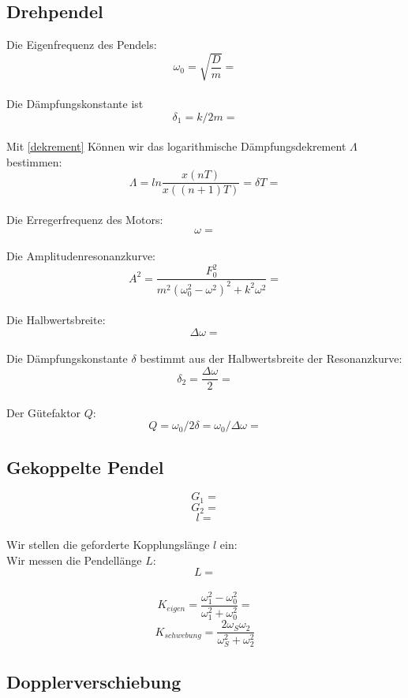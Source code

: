 \documentclass{article}
\begin{document}
\subsection{Drehpendel}
Die Eigenfrequenz des Pendels:
$$\omega_0=\sqrt{\frac{D}{m}}=$$
\\
Die Dämpfungskonstante ist
$$\delta_1=k/2m=$$
\\
Mit \ref{dekrement} Können wir das logarithmische Dämpfungsdekrement $\Lambda$ bestimmen:
$$\Lambda=ln\frac{x(nT)}{x((n+1)T)}=\delta T=$$
\\
Die Erregerfrequenz des Motors:
$$\omega=$$
\\
Die Amplitudenresonanzkurve:
$$A^2=\frac{F_0^2}{m^2(\omega_0^2-\omega^2)^2+k^2\omega^2}=$$
\\
Die Halbwertsbreite:
$$\Delta \omega=$$
\\
Die Dämpfungskonstante $\delta$ bestimmt aus der Halbwertsbreite der Resonanzkurve:
$$\delta_2=\frac{\Delta \omega}{2}=$$
\\
Der Gütefaktor $Q$:
$$Q=\omega_0/2\delta=\omega_0/\Delta \omega=$$


\subsection{Gekoppelte Pendel}

$$G_1=$$
$$G_2=$$
$$l=$$
\\
Wir stellen die geforderte Kopplungslänge $l$ ein:\\
Wir messen die Pendellänge $L$:
$$L=$$
\\

$$K_{eigen}=\frac{\omega_1^2-\omega_0^2}{\omega_1^2+\omega_0^2}=$$
$$K_{schwebung}=\frac{2\omega_S \omega_2}{\omega_S^2 + \omega_2^2}$$

\subsection{Dopplerverschiebung}
\end{document}
